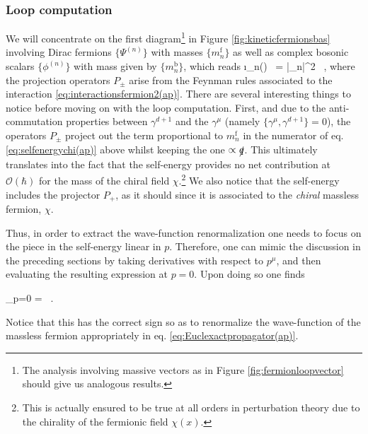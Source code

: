 \subsubsection*{Loop computation}
		
We will concentrate on the first diagram\footnote{The analysis involving massive vectors as in Figure \ref{fig:fermionloopvector} should give us analogous results.} in Figure \ref{fig:kineticfermionsbas} involving Dirac fermions $\{\Psi^{(n)}\}$ with masses $\{m_n^{{\text{f}}}\}$ as well as complex bosonic scalars $\{\phi^{(n)}\}$ with mass given by $\{m_n^{{\text{b}}}\}$, which reads
%
\beq
		\i \Sigma_n() \ = |_n|^2 \int {}  \, ,
\label{eq:selfenergychi(ap)}
\eeq
%
where the projection operators $P_{\pm}$ arise from the Feynman rules associated to the interaction \eqref{eq:interactionsfermion2(ap)}. There are several interesting things to notice before moving on with the loop computation. First, and due to the anti-commutation properties between $\gamma^{d+1}$ and the $\gamma^{\mu}$ (namely $\lbrace \gamma^{\mu}, \gamma^{d+1} \rbrace=0$), the operators $P_{\pm}$ project out the term proportional to $m_n^{{\text{f}}}$ in the numerator of eq. \eqref{eq:selfenergychi(ap)} above whilst keeping the one $\propto \slashed{q}$. This ultimately translates into the fact that the self-energy provides no net contribution at $\mathcal{O}(\hbar)$ for the mass of the chiral field $\chi$.\footnote{This is actually ensured to be true at all orders in perturbation theory due to the chirality of the fermionic field $\chi(x)$.} We also notice that the self-energy includes the projector $P_{+}$, as it should since it is associated to the \emph{chiral} massless fermion, $\chi$.
		
Thus, in order to extract the wave-function renormalization one needs to focus on the piece in the self-energy linear in $p$. Therefore, one can mimic the discussion in the preceding sections by taking derivatives with respect to $p^{\mu}$, and then evaluating the resulting expression at $p=0$. Upon doing so one finds
%
\beq
		\begin{aligned}\label{eq:Euclwavefunctionfermion(ap)}
			 \bigg\rvert_{p=0} =  \int {} \, .
		\end{aligned}
\eeq
%
Notice that this has the correct sign so as to renormalize the wave-function of the massless fermion appropriately in eq. \eqref{eq:Euclexactpropagator(ap)}. 
		
